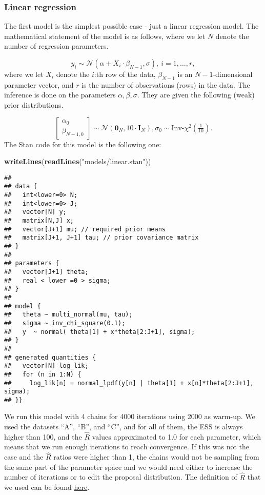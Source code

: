 \documentclass[
]{article}
\newenvironment{Shaded}{\begin{snugshade}}{\end{snugshade}}
\newcommand{\KeywordTok}[1]{\textcolor[rgb]{0.13,0.29,0.53}{\textbf{#1}}}
\newcommand{\NormalTok}[1]{#1}
\newcommand{\StringTok}[1]{\textcolor[rgb]{0.31,0.60,0.02}{#1}}
\begin{document}
\hypertarget{linear-regression}{%
\subsubsection{Linear regression}\label{linear-regression}}

The first model is the simplest possible case - just a linear regression
model. The mathematical statement of the model is as follows, where we
let \(N\) denote the number of regression parameters.

\[ y_{i} \sim \mathcal{N}(\alpha + X_i \cdot\beta_{N-1}, \sigma), \ i=1,\dots,r, \]
where we let \(X_i\) denote the \(i\):th row of the data,
\(\beta_{N-1}\) is an \(N-1\)-dimensional parameter vector, and \(r\) is
the number of observations (rows) in the data. The inference is done on
the parameters \(\alpha , \beta, \sigma.\) They are given the following
(weak) prior distributions.

\[\begin{bmatrix} \alpha_0 \\ \beta_{N-1,0} \end{bmatrix} \sim \mathcal{N}(\mathbf{0}_N, 10 \cdot \mathbf{I}_N), \sigma_0 \sim \textrm{Inv-}\chi^2(\tfrac{1}{10}) .\]
The Stan code for this model is the following one:

\begin{Shaded}
\begin{Highlighting}[]
\KeywordTok{writeLines}\NormalTok{(}\KeywordTok{readLines}\NormalTok{(}\StringTok{"models/linear.stan"}\NormalTok{))}
\end{Highlighting}
\end{Shaded}

\begin{verbatim}
## 
## data {
##   int<lower=0> N;
##   int<lower=0> J;
##   vector[N] y;
##   matrix[N,J] x;
##   vector[J+1] mu; // required prior means 
##   matrix[J+1, J+1] tau; // prior covariance matrix
## }
## 
## parameters {
##   vector[J+1] theta;
##   real < lower =0 > sigma;
## }
## 
## model {
##   theta ~ multi_normal(mu, tau);
##   sigma ~ inv_chi_square(0.1);
##   y  ~ normal( theta[1] + x*theta[2:J+1], sigma);
## }
## 
## generated quantities {
##   vector[N] log_lik;
##   for (n in 1:N) {
##     log_lik[n] = normal_lpdf(y[n] | theta[1] + x[n]*theta[2:J+1], sigma);
## }}
\end{verbatim}

We run this model with 4 chains for 4000 iterations using 2000 as
warm-up. We used the datasets ``A'', ``B'', and ``C'', and for all of
them, the ESS is always higher than 100, and the \(\hat{R}\) values
approximated to 1.0 for each parameter, which means that we run enough
iterations to reach convergence. If this was not the case and the
\(\hat{R}\) ratios were higher than 1, the chains would not be sampling
from the same part of the parameter space and we would need either to
increase the number of iterations or to edit the proposal distribution.
The definition of \(\hat{R}\) that we used can be found
\href{https://arxiv.org/abs/1903.08008}{here}.
\end{document}
